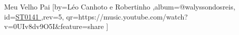 \beginsong
{Meu Velho Pai %
}[by={Léo Canhoto e Robertinho %
},album={@walyssondosreis},
id={\href{https://music.youtube.com/watch?v=0UIv8dv9O5I&feature=share %
}{ST0141 %
}},rev={5}, %
qr={https://music.youtube.com/watch?v=0UIv8dv9O5I&feature=share %
}]
\beginverse
